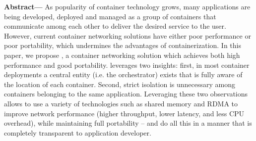 \textbf{Abstract---} 
As popularity of container technology grows, many applications are being
developed, deployed and managed as a group of containers that communicate
among each other to deliver the desired service to the user.  However, current
container networking solutions have either poor performance or poor portability,
which undermines the advantages of containerization.  In this paper, we propose
\sysname, a container networking solution which achieves both high performance
and good portability. \sysname leverages two insights: first, in most container
deployments a central entity (i.e. the orchestrator) exists that is fully aware
of the location of each container. Second, strict isolation is unnecessary
among containers belonging to the same application. Leveraging these two
observations allows \sysname to use a variety of technologies such as shared
memory and RDMA to improve network performance (higher throughput, lower
latency, and less CPU overhead), while maintaining full portability -- and do
all this in a manner that is completely transparent to application developer.

